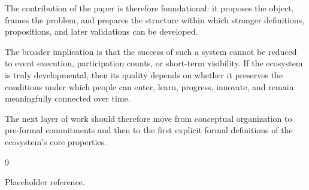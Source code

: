 \documentclass[11pt]{article}
\begin{document}
The contribution of the paper is therefore foundational: it proposes the object, frames the problem, and prepares the structure within which stronger definitions, propositions, and later validations can be developed.

The broader implication is that the success of such a system cannot be reduced to event execution, participation counts, or short-term visibility. If the ecosystem is truly developmental, then its quality depends on whether it preserves the conditions under which people can enter, learn, progress, innovate, and remain meaningfully connected over time.

The next layer of work should therefore move from conceptual organization to pre-formal commitments and then to the first explicit formal definitions of the ecosystem's core properties.


\begin{thebibliography}{9}

Placeholder reference.

\end{thebibliography}
\end{document}
